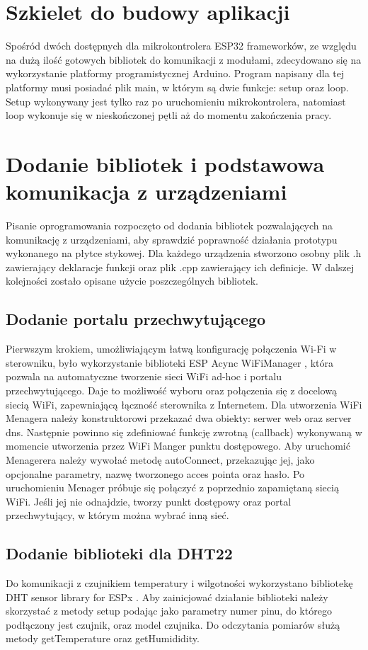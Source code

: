 \documentclass[11pt]{report}
\begin{document}
 \section{Szkielet do budowy aplikacji}
 Spośród dwóch dostępnych dla mikrokontrolera ESP32 frameworków, ze względu na dużą ilość gotowych bibliotek do komunikacji z modułami, zdecydowano się na wykorzystanie platformy programistycznej Arduino.
 Program napisany dla tej platformy musi posiadać plik main, w którym są dwie funkcje: setup oraz loop.
 Setup wykonywany jest tylko raz po uruchomieniu mikrokontrolera, natomiast loop wykonuje się w nieskończonej pętli aż do momentu zakończenia pracy.
 
 \section{Dodanie bibliotek i podstawowa komunikacja z urządzeniami}
 Pisanie oprogramowania rozpoczęto od dodania bibliotek pozwalających na komunikację z urządzeniami, aby sprawdzić poprawność działania prototypu wykonanego na płytce stykowej. Dla każdego urządzenia stworzono osobny plik .h zawierający deklaracje funkcji oraz plik .cpp zawierający ich definicje.
 W dalszej kolejności zostało opisane użycie poszczególnych bibliotek.
  \subsection{Dodanie portalu przechwytującego}
 Pierwszym krokiem, umożliwiającym łatwą konfigurację połączenia Wi-Fi w sterowniku, było wykorzystanie biblioteki ESP Acync WiFiManager \cite{WiFiManager}, która pozwala na automatyczne tworzenie sieci WiFi ad-hoc i portalu przechwytującego. Daje to możliwość wyboru oraz połączenia się z docelową siecią WiFi, zapewniającą łączność sterownika z Internetem.
 Dla utworzenia WiFi Menagera należy konstruktorowi przekazać dwa obiekty: serwer web oraz server dns. Następnie powinno się zdefiniować funkcję zwrotną (callback) wykonywaną w momencie utworzenia przez WiFi Manger punktu dostępowego. Aby uruchomić Menagerera należy wywołać metodę autoConnect, przekazując jej, jako opcjonalne parametry, nazwę tworzonego acces pointa oraz hasło. Po uruchomieniu Menager próbuje się połączyć z poprzednio zapamiętaną siecią WiFi. Jeśli jej nie odnajdzie, tworzy punkt dostępowy oraz portal przechwytujący, w którym można wybrać inną sieć.
 \subsection{Dodanie biblioteki dla DHT22}
 Do komunikacji z czujnikiem temperatury i wilgotności wykorzystano bibliotekę DHT sensor library for ESPx \cite{DHTlibrary}. Aby zainicjować działanie biblioteki należy skorzystać z metody setup podając jako parametry numer pinu, do którego podłączony jest czujnik, oraz model czujnika. Do odczytania pomiarów służą metody getTemperature oraz getHumididity.
\end{document}
